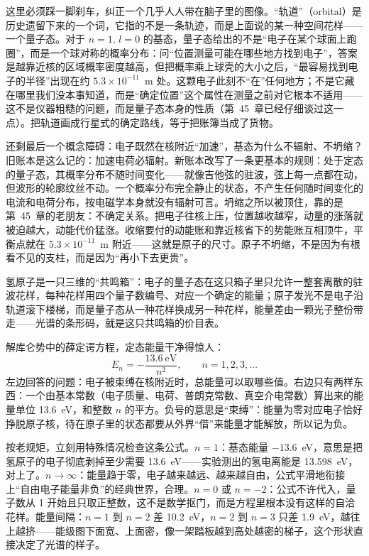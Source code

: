 这里必须踩一脚刹车，纠正一个几乎人人带在脑子里的图像。“轨道”（orbital）是历史遗留下来的一个词，它指的不是一条轨迹，而是上面说的某一种空间花样——一个量子态。对于 \(n=1,\,l=0\) 的基态，量子态给出的不是“电子在某个球面上跑圈”，而是一个球对称的概率分布：问“位置测量可能在哪些地方找到电子”，答案是越靠近核的区域概率密度越高，但把概率乘上球壳的大小之后，“最容易找到电子的半径”出现在约 \(5.3\times10^{-11}\)~m 处。这颗电子此刻不“在”任何地方；不是它藏在哪里我们没本事知道，而是“确定位置”这个属性在测量之前对它根本不适用——这不是仪器粗糙的问题，而是量子态本身的性质（第~45~章已经仔细谈过这一点）。把轨道画成行星式的确定路线，等于把账簿当成了货物。

还剩最后一个概念障碍：电子既然在核附近“加速”，基态为什么不辐射、不坍缩？旧账本是这么记的：加速电荷必辐射。新账本改写了一条更基本的规则：处于定态的量子态，其概率分布不随时间变化——就像吉他弦的驻波，弦上每一点都在动，但波形的轮廓纹丝不动。一个概率分布完全静止的状态，不产生任何随时间变化的电流和电荷分布，按电磁学本身就没有辐射可言。坍缩之所以被顶住，靠的是第~45~章的老朋友：不确定关系。把电子往核上压，位置越收越窄，动量的涨落就被迫越大，动能代价猛涨。收缩要付的动能账和靠近核省下的势能账互相顶牛，平衡点就在 \(5.3\times10^{-11}\)~m 附近——这就是原子的尺寸。原子不坍缩，不是因为有根看不见的支柱，而是因为“再小下去更贵”。

\begin{oneline}
氢原子是一只三维的“共鸣箱”：电子的量子态在这只箱子里只允许一整套离散的驻波花样，每种花样用四个量子数编号、对应一个确定的能量；原子发光不是电子沿轨道滚下楼梯，而是量子态从一种花样换成另一种花样，能量差由一颗光子整份带走——光谱的条形码，就是这只共鸣箱的价目表。
\end{oneline}


解库仑势中的薛定谔方程，定态能量干净得惊人：
\[
E_n=-\frac{13.6\ \mathrm{eV}}{n^2},\qquad n=1,2,3,\dots
\]
左边回答的问题：电子被束缚在核附近时，总能量可以取哪些值。右边只有两样东西：一个由基本常数（电子质量、电荷、普朗克常数、真空介电常数）算出来的能量单位 13.6~eV，和整数 \(n\) 的平方。负号的意思是“束缚”：能量为零对应电子恰好挣脱原子核，待在原子里的状态都要从外界“借”来能量才能解放，所以记为负。

按老规矩，立刻用特殊情况检查这条公式。\(n=1\)：基态能量 \(-13.6\)~eV，意思是把氢原子的电子彻底剥掉至少需要 13.6~eV——实验测出的氢电离能是 13.598~eV，对上了。\(n\to\infty\)：能量趋于零，电子越来越远、越来越自由，公式平滑地衔接上“自由电子能量非负”的经典世界，合理。\(n=0\) 或 \(n=-2\)：公式不许代入，量子数从 1 开始且只取正整数，这不是数学抠门，而是方程里根本没有这样的自洽花样。能量间隔：\(n=1\) 到 \(n=2\) 差 10.2~eV，\(n=2\) 到 \(n=3\) 只差 1.9~eV，越往上越挤——能级图下面宽、上面密，像一架踏板越到高处越密的梯子，这个形状直接决定了光谱的样子。

